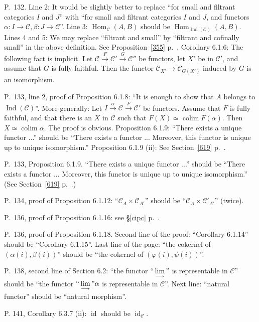 \documentclass[12pt]{article}
\theoremstyle{remark}
\theoremstyle{definition}
\newcommand{\C}{\mathcal C}
\DeclareMathOperator*{\coli}{colim}
\DeclareMathOperator{\id}{id}
\DeclareMathOperator{\Hom}{Hom}%
\DeclareMathOperator{\Ind}{Ind}
\begin{document}
\noindent P.~132. Line 2: It would be slightly better to replace ``for small and filtrant categories $I$ and $J$'' with ``for small and filtrant categories $I$ and $J$, and functors $\alpha:I\to\C,\beta:J\to\C$''. Line 3: $\Hom_\C(A,B)$ should be $\Hom_{\Ind(\C)}(A,B)$. Lines 4 and 5: \guillemotleft We may replace ``filtrant and small'' by ``filtrant and cofinally small'' in the above definition\guillemotright. See Proposition~\ref{355} p.~\pageref{355}. Corollary 6.1.6: The following fact is implicit. Let $\C\xrightarrow{F}\C'\xrightarrow{G}\C''$ be functors, let $X'$ be in $\C'$, and assume that $G$ is fully faithful. Then the functor $\C_{X'}\to\C_{G(X')}$ induced by $G$ is an isomorphism.

\noindent P.~133, line 2, proof of Proposition 6.1.8: ``It is enough to show that $A$ belongs to $\Ind(\C)$''. More generally: Let $I\xrightarrow{\alpha}\C\xrightarrow{F}\C'$ be functors. Assume that $F$ is fully faithful, and that there is an $X$ in $\C$ such that $F(X)\simeq\coli F(\alpha)$. Then $X\simeq\coli\alpha$. The proof is obvious. Proposition 6.1.9: ``There exists a unique functor ...'' should be ``There exists a functor ... Moreover, this functor is unique up to unique isomorphism.'' Proposition 6.1.9 (ii): See Section~\ref{619} p.~\pageref{619}.

\noindent P.~133, Proposition 6.1.9. ``There exists a unique functor ...'' should be ``There exists a functor ... Moreover, this functor is unique up to unique isomorphism.'' (See Section~\ref{619} p.~\pageref{619}.)

\noindent P.~134, proof of Proposition 6.1.12: ``$\C_A\times\C_{A'}$'' should be ``$\C_A\times\C'_{A'}$'' (twice).

\noindent P.~136, proof of Proposition 6.1.16: see \S\ref{cipc} p.~\pageref{cipc}.

\noindent P.~136, proof of Proposition 6.1.18. Second line of the proof: ``Corollary 6.1.14'' should be ``Corollary 6.1.15''. Last line of the page: ``the cokernel of $(\alpha(i),\beta(i))$'' should be ``the cokernel of $(\varphi(i),\psi(i))$''.

\noindent P.~138, second line of Section 6.2: ``the functor $``\displaystyle\lim_{\longrightarrow}"$ is representable in $\C$'' should be ``the functor $``\displaystyle\lim_{\longrightarrow}"\alpha$ is representable in $\C$''. Next line: ``natural functor'' should be ``natural morphism''.

\noindent P. 141, Corollary 6.3.7 (ii): $\id$ should be $\id_\C$.
\end{document}

